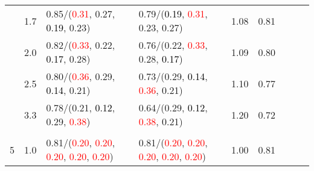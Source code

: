 \documentclass[10pt,a4paper]{report}
\begin{document}
\begin{table}[!htbp]
\begin{center}
{\begin{tabular}{ccllccccc}
				  & 1.7                               & 0.85/(\textcolor{red}{0.31}, 0.27, \textcolor{black}{0.19}, 0.23)                                                                                                                             & 0.79/(\textcolor{black}{0.19}, \textcolor{red}{0.31}, 0.23, 0.27)                                                                                                                             & 1.08             & 0.81                     \\
				  & 2.0                               & 0.82/(\textcolor{red}{0.33}, 0.22, \textcolor{black}{0.17}, 0.28)                                                                                                                             & 0.76/(0.22, \textcolor{red}{0.33}, 0.28, \textcolor{black}{0.17})                                                                                                                             & 1.09             & 0.80                     \\
				  & 2.5                               & 0.80/(\textcolor{red}{0.36}, 0.29, \textcolor{black}{0.14}, 0.21)                                                                                                                             & 0.73/(0.29, \textcolor{black}{0.14}, \textcolor{red}{0.36}, 0.21)                                                                                                                             & 1.10             & 0.77                     \\
				  & 3.3                               & 0.78/(0.21, \textcolor{black}{0.12}, 0.29, \textcolor{red}{0.38})                                                                                                                             & 0.64/(0.29, \textcolor{black}{0.12}, \textcolor{red}{0.38}, 0.21)                                                                                                                             & 1.20             & 0.72                     \\
				  &                                   &                                                                                                                                                                                               &                                                                                                                                                                                               &                                             \\
				5 & 1.0                               & 0.81/(\textcolor{red}{0.20}, \textcolor{red}{0.20}, \textcolor{red}{0.20}, \textcolor{red}{0.20}, \textcolor{red}{0.20})                                                                      & 0.81/(\textcolor{red}{0.20}, \textcolor{red}{0.20}, \textcolor{red}{0.20}, \textcolor{red}{0.20}, \textcolor{red}{0.20})                                                                      & 1.00             & 0.81                     \\

\end{tabular}}
\end{center}
\end{table}
\end{document}
